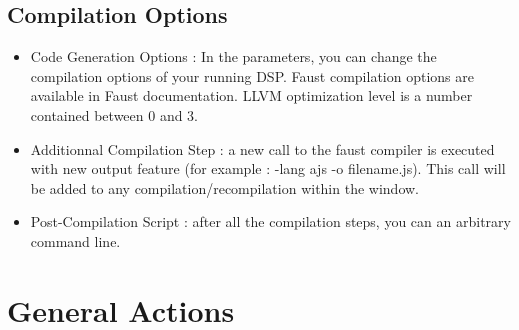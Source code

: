 \documentclass[a4paper]{article}
\begin{document}



\subsection{Compilation Options}

\begin{itemize}

\item Code Generation Options : In the parameters, you can change the compilation options of your running DSP. Faust compilation options are available in Faust documentation. LLVM optimization level is a number contained between 0 and 3. 

\item Additionnal Compilation Step : a new call to the faust compiler is executed with new output feature (for example : -lang ajs -o filename.js). This call will be added to any compilation/recompilation within the window.

\item Post-Compilation Script : after all the compilation steps, you can an arbitrary command line.

\end{itemize}

\section{General Actions}
\end{document}
